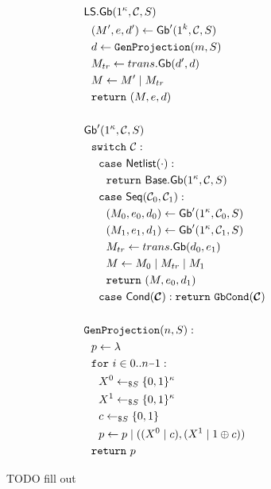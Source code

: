 \begin{figure}
\begin{adjustwidth}{-0.1\textwidth}{-0.1\textwidth}
\begin{minipage}[t]{0.40\linewidth}
\begin{align*}
      &\ourscheme.\gGb(1^\kappa, \cir, S)\\
      &~~(\mat', e, d') \gets \gGb'(1^k, \cir, S)\\
      &~~d \gets \genprojection(m, S)\\
      &~~\mat_{tr} \gets \gbtranslate(d', d)\\
      &~~\mat \gets \mat'\mid\mat_{tr}\\
      &~~\creturn~(\mat, e, d)\\
      \\
      &\gGb'(1^\kappa, \cir, S)\\
      &~~\switch~\cir:\\
      &~~~~\ccase~\netlist(\cdot):\\
      &~~~~~~\creturn~\underscheme.\gGb(1^\kappa,\cir,S)\\
      &~~~~\ccase~\sequential(\cir_0, \cir_1):\\
      &~~~~~~(\mat_0, e_0, d_0) \gets \gGb'(1^\kappa,\cir_0, S)\\
      &~~~~~~(\mat_1, e_1, d_1) \gets \gGb'(1^\kappa,\cir_1, S)\\
      &~~~~~~\mat_{tr} \gets \gbtranslate(d_0,e_1)\\
      &~~~~~~\mat \gets \mat_0\mid \mat_{tr}\mid \mat_1\\
      &~~~~~~\creturn~(\mat, e_0, d_1)\\
      &~~~~\ccase~\conditional(\vec \cir): \creturn~\gbcond(\vec \cir)\\
      \\
      &\genprojection(n, S):\\
      &~~p \gets \lambda\\
      &~~\cfor~i \in 0..n\minus 1:\\
      &~~~~X^0 \drawnfrom{S} \{0, 1\}^{\kappa}\\
      &~~~~X^1 \drawnfrom{S} \{0, 1\}^{\kappa}\\
      &~~~~c \drawnfrom{S} \{0, 1\}\\
      &~~~~p \gets p \mid ((X^0\mid c), (X^1\mid \xor{1}{c}))\\
      &~~\creturn~p
    \end{align*}
  \end{minipage}
  \end{adjustwidth}
  \caption{%
    TODO fill out
  }\label{fig:scheme}
\end{figure}

